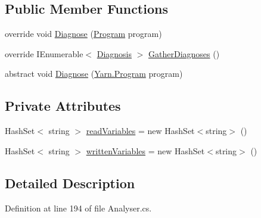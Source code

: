 \subsection*{Public Member Functions}
\begin{DoxyCompactItemize}
\item 
override void \hyperlink{a00175_aeac8f333d4dcc85f4d4a716bf8fea01f}{Diagnose} (\hyperlink{a00142}{Program} program)
\item 
override I\-Enumerable$<$ \hyperlink{a00081}{Diagnosis} $>$ \hyperlink{a00175_a107aecf707b130c4b733930a95f9154e}{Gather\-Diagnoses} ()
\item 
abstract void \hyperlink{a00043_aba4a36cb823b11ee491074e26477d084}{Diagnose} (\hyperlink{a00142}{Yarn.\-Program} program)
\end{DoxyCompactItemize}
\subsection*{Private Attributes}
\begin{DoxyCompactItemize}
\item 
Hash\-Set$<$ string $>$ \hyperlink{a00175_a6b542092ddce1b92c9455d60899518a9}{read\-Variables} = new Hash\-Set$<$string$>$ ()
\item 
Hash\-Set$<$ string $>$ \hyperlink{a00175_a0c2fe6eded1b10b135ca2469f5980a39}{written\-Variables} = new Hash\-Set$<$string$>$ ()
\end{DoxyCompactItemize}


\subsection{Detailed Description}


Definition at line 194 of file Analyser.\-cs.



